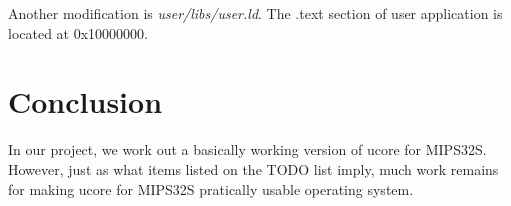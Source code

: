 \documentclass[a4paper]{article}
\begin{document}
Another modification is \emph{user/libs/user.ld}.
The .text section of user application is located at  0x10000000.


\section{Conclusion}
In our project, we work out a basically working version of ucore for MIPS32S.
However, just as what items listed on the TODO list imply,
much work remains for making ucore for MIPS32S pratically usable
operating system.





\end{document}
